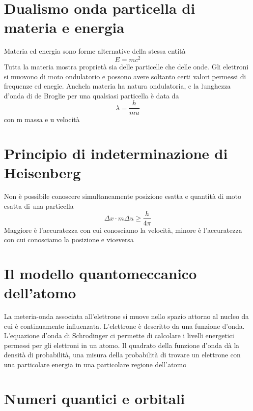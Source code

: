 \documentclass[a4paper,11pt]{report}
\begin{document}
\section{Dualismo onda particella di materia e energia}

Materia ed energia sono forme alternative della stessa entità
\begin{equation*}
	E = mc^2
\end{equation*}
Tutta la materia mostra proprietà sia delle particelle che delle onde. Gli elettroni si muovono di moto ondulatorio e possono avere soltanto certi valori permessi di frequenze ed enegie. 
Anchela materia ha natura ondulatoria, e la lunghezza d'onda di de Broglie per una qualsiasi particella è data da 
\begin{equation*}
	\lambda = \frac{h}{mu}
\end{equation*}
con m massa e u velocità

\section{Principio di indeterminazione di Heisenberg}

Non è possibile conoscere simultaneamente posizione esatta e quantità di moto esatta di una particella
\begin{equation*}
	\Delta x \cdot m \Delta u \ge \frac{h}{4\pi}
\end{equation*}
Maggiore è l'accuratezza con cui conosciamo la velocità, minore è l'accuratezza con cui conosciamo la posizione e viceversa

\section{Il modello quantomeccanico dell'atomo}

La meteria-onda associata all'elettrone si muove nello spazio attorno al nucleo da cui è continuamente influenzata. L'elettrone è descritto da una funzione d'onda. 
L'equazione d'onda di Schrodinger ci permette di calcolare i livelli energetici permessi per gli elettroni in un atomo. 
Il quadrato della funzione d'onda dà la densità di probabilità, una misura della probabilità di trovare un elettrone con una particolare energia in una particolare regione dell'atomo

\section{Numeri quantici e orbitali}
\end{document}
